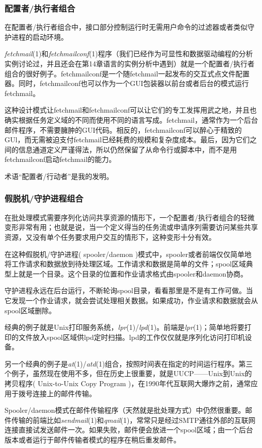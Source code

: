 \documentclass[12pt,oneside]{book}
\begin{document}
\begin{common-format}
\subsubsection{配置者/执行者组合}
在配置者/执行者组合中，接口部分控制运行时无需用户命令的过滤器或者类似守护进程的启动环境。

\textit{fetchmail}(1)和\textit{fetchmailconf}(1)程序（我们已经作为可显性和数据驱动编程的分析实例讨论过，并且还会在第14章语言的实例分析中遇到）就是一个配置者/执行者组合的很好例子。fetchmailconf是一个随fetchmail一起发布的交互式点文件配置器。同时，fetchmailconf也可以作为一个GUI包装器以前台或者后台的模式运行fetchmail。

这种设计模式让fetchmail和fetchmailconf可以让它们的专工发挥用武之地，并且也确实根据任务定义域的不同而使用不同的语言写成。fetchmail，通常作为一个后台邮件程序，不需要臃肿的GUI代码。相反的，fetchmailconf可以醉心于精致的GUl，而无需被迫支付fetchmail已经耗费的规模和复杂度成本。最后，因为它们之间的信息通道定义严谨得法，所以仍然保留了从命令行或脚本中，而不是用fetchmailconf启动fetchmail的能力。

术语“配置者/行动者”是我的发明。

\subsubsection{假脱机/守护进程组合}
在批处理模式需要序列化访问共享资源的情形下，一个配置者/执行者组合的轻微变形非常有用；也就是说，当一个定义得当的任务流或申请序列需要访问某些共享资源，又没有单个任务要求用户交互的情形下，这种变形十分有效。

在这种假脱机/守护进程( spooler/daemon )模式中，spooler或者前端仅仅简单地将工作请求和数据放到待处理区域。工作请求和数据是简单的文件；spool区域典型上就是一个目录。这个目录的位置和作业请求格式由spooler和daemon协商。

守护进程永远在后台运行，不断轮询spool目录，看看那里是不是有工作可做。当它发现一个作业请求，就会尝试处理相关数据。如果成功，作业请求和数据就会从spool区域删除。

经典的例子就是Unix打印服务系统，\textit{lpr}(1)/\textit{lpd}(1)。前端是\textit{lpr}(1)；简单地将要打印的文件放入spool区域供lpd定时扫描。lpd的工作仅仅就是序列化访问打印机设备。

另一个经典的例子是\textit{at}(1)/\textit{atd}(1)组合，按照时间表在指定的时间运行程序。第三个例子，虽然现在使用不多，但在历史上很重要，就是UUCP——Unix到Unix的拷贝程序( Unix-to-Unix Copy Program )，在1990年代互联网大爆炸之前，通常应用于拨号连接上的邮件传输。

Spooler/daemon模式在邮件传输程序（天然就是批处理方式）中仍然很重要。邮件传输的前端比如\textit{sendmail}(1)和\textit{qmail}(1)，常常只是经过SMTP通往外部的互联网连接直接试发送邮件一次。如果失败，邮件便会放进一个spool区域；由一个后台版本或者运行于邮件传输者模式的程序在稍后重发邮件。


\end{common-format}
\end{document}
